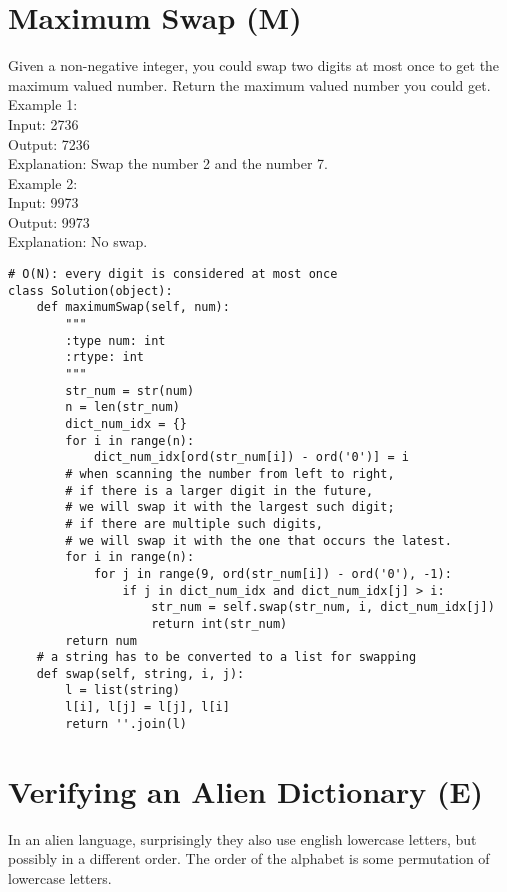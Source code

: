 \section{Maximum Swap (M)}
 Given a non-negative integer, you could swap two digits at most once to get the maximum valued number. Return the maximum valued number you could get.\\

Example 1:\\
Input: 2736\\
Output: 7236\\
Explanation: Swap the number 2 and the number 7.\\

Example 2:\\
Input: 9973\\
Output: 9973\\
Explanation: No swap.\\

\begin{lstlisting}
# O(N): every digit is considered at most once
class Solution(object):
    def maximumSwap(self, num):
        """
        :type num: int
        :rtype: int
        """
        str_num = str(num)
        n = len(str_num)
        dict_num_idx = {}
        for i in range(n):
            dict_num_idx[ord(str_num[i]) - ord('0')] = i
        # when scanning the number from left to right, 
        # if there is a larger digit in the future, 
        # we will swap it with the largest such digit; 
        # if there are multiple such digits, 
        # we will swap it with the one that occurs the latest.        
        for i in range(n):
            for j in range(9, ord(str_num[i]) - ord('0'), -1):
                if j in dict_num_idx and dict_num_idx[j] > i:
                    str_num = self.swap(str_num, i, dict_num_idx[j])
                    return int(str_num)
        return num
    # a string has to be converted to a list for swapping
    def swap(self, string, i, j):
        l = list(string)
        l[i], l[j] = l[j], l[i]
        return ''.join(l)
\end{lstlisting}

\section{Verifying an Alien Dictionary (E)}
In an alien language, surprisingly they also use english lowercase letters, but possibly in a different order. The order of the alphabet is some permutation of lowercase letters.

